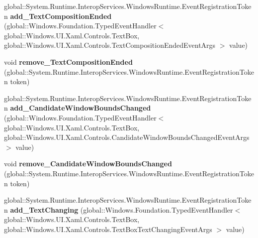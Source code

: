 \begin{DoxyCompactItemize}
\mbox{\label{interface_windows_1_1_u_i_1_1_xaml_1_1_controls_1_1_i_text_box3_a954246509dfb0e6ccf8afcceb314875e}} 
global\+::\+System.\+Runtime.\+Interop\+Services.\+Windows\+Runtime.\+Event\+Registration\+Token {\bfseries add\+\_\+\+Text\+Composition\+Ended} (global\+::\+Windows.\+Foundation.\+Typed\+Event\+Handler$<$ global\+::\+Windows.\+U\+I.\+Xaml.\+Controls.\+Text\+Box, global\+::\+Windows.\+U\+I.\+Xaml.\+Controls.\+Text\+Composition\+Ended\+Event\+Args $>$ value)
\item 
\mbox{\label{interface_windows_1_1_u_i_1_1_xaml_1_1_controls_1_1_i_text_box3_a1eca96501dfb3670f5fe1de3606e2c05}} 
void {\bfseries remove\+\_\+\+Text\+Composition\+Ended} (global\+::\+System.\+Runtime.\+Interop\+Services.\+Windows\+Runtime.\+Event\+Registration\+Token token)
\item 
\mbox{\label{interface_windows_1_1_u_i_1_1_xaml_1_1_controls_1_1_i_text_box3_af4821dda073f7c190c8b91cbd457a08d}} 
global\+::\+System.\+Runtime.\+Interop\+Services.\+Windows\+Runtime.\+Event\+Registration\+Token {\bfseries add\+\_\+\+Candidate\+Window\+Bounds\+Changed} (global\+::\+Windows.\+Foundation.\+Typed\+Event\+Handler$<$ global\+::\+Windows.\+U\+I.\+Xaml.\+Controls.\+Text\+Box, global\+::\+Windows.\+U\+I.\+Xaml.\+Controls.\+Candidate\+Window\+Bounds\+Changed\+Event\+Args $>$ value)
\item 
\mbox{\label{interface_windows_1_1_u_i_1_1_xaml_1_1_controls_1_1_i_text_box3_a0bc959a10affe7408662639bed13c278}} 
void {\bfseries remove\+\_\+\+Candidate\+Window\+Bounds\+Changed} (global\+::\+System.\+Runtime.\+Interop\+Services.\+Windows\+Runtime.\+Event\+Registration\+Token token)
\item 
\mbox{\label{interface_windows_1_1_u_i_1_1_xaml_1_1_controls_1_1_i_text_box3_a920756886d20926b07cab72000c0e58c}} 
global\+::\+System.\+Runtime.\+Interop\+Services.\+Windows\+Runtime.\+Event\+Registration\+Token {\bfseries add\+\_\+\+Text\+Changing} (global\+::\+Windows.\+Foundation.\+Typed\+Event\+Handler$<$ global\+::\+Windows.\+U\+I.\+Xaml.\+Controls.\+Text\+Box, global\+::\+Windows.\+U\+I.\+Xaml.\+Controls.\+Text\+Box\+Text\+Changing\+Event\+Args $>$ value)

\end{DoxyCompactItemize}
